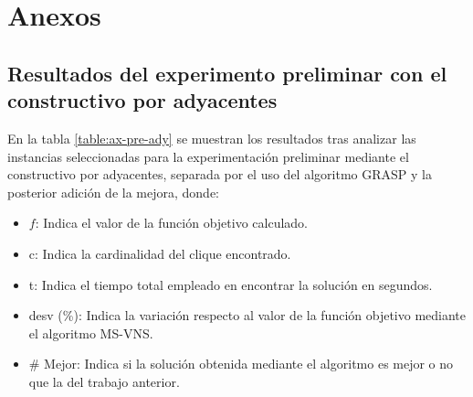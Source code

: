 
\chapter{Anexos} %

\label{Anexos} %

\section{Resultados del experimento preliminar con el constructivo por adyacentes}
\label{anex:tabla_adys}

En la tabla \ref{table:ax-pre-ady} se muestran los resultados tras analizar las instancias seleccionadas para la experimentación preliminar mediante el constructivo por adyacentes, separada por el uso del algoritmo \gls{GRASP} y la posterior adición de la mejora, donde:
\begin{itemize}
	\item $f$: Indica el valor de la función objetivo calculado.
	\item c: Indica la cardinalidad del clique encontrado.
	\item t: Indica el tiempo total empleado en encontrar la solución en segundos.
	\item desv (\%): Indica la variación respecto al valor de la función objetivo mediante el algoritmo MS-VNS.
	\item \# Mejor: Indica si la solución obtenida mediante el algoritmo es mejor o no que la del trabajo anterior.
\end{itemize}


